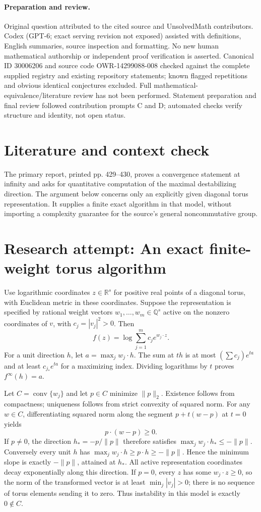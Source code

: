 \documentclass[11pt]{article}
\begin{document}
\paragraph{Preparation and review.}
Original question attributed to the cited source and UnsolvedMath contributors. Codex (GPT-6; exact serving revision not exposed) assisted with definitions, English summaries, source inspection and formatting. No new human mathematical authorship or independent proof verification is asserted. Canonical ID 30006206 and source code OWR-14299088-008 checked against the complete supplied registry and existing repository statements; known flagged repetitions and obvious identical conjectures excluded. Full mathematical-equivalence/literature review has not been performed. Statement preparation and final review followed contribution prompts C and D; automated checks verify structure and identity, not open status.
\label{end:30006206}

\section{Literature and context check}
The primary report, printed pp. 429--430, proves a convergence statement at infinity and asks for quantitative computation of the maximal destabilizing direction. The argument below concerns only an explicitly given diagonal torus representation. It supplies a finite exact algorithm in that model, without importing a complexity guarantee for the source's general noncommutative group.
\section{Research attempt: An exact finite-weight torus algorithm}

Use logarithmic coordinates $z\in\mathbb R^s$ for positive real points of a diagonal torus, with Euclidean metric in these coordinates. Suppose the representation is specified by rational weight vectors $w_1,\ldots,w_m\in\mathbb Q^s$ active on the nonzero coordinates of $v$, with $c_j=|v_j|^2>0$. Then
\[
f(z)=\log\sum_{j=1}^m c_j e^{w_j\cdot z}.
\]
For a unit direction $h$, let $a=\max_j w_j\cdot h$. The sum at $th$ is at most $(\sum c_j)e^{ta}$ and at least $c_{j_*}e^{ta}$ for a maximizing index. Dividing logarithms by $t$ proves $f^\infty(h)=a$.

Let $C=\operatorname{conv}\{w_j\}$ and let $p\in C$ minimize $\|p\|_2$. Existence follows from compactness; uniqueness follows from strict convexity of squared norm. For any $w\in C$, differentiating squared norm along the segment $p+t(w-p)$ at $t=0$ yields
\[
p\cdot(w-p)\geq0.
\]
If $p\ne0$, the direction $h_*=-p/\|p\|$ therefore satisfies $\max_j w_j\cdot h_*\leq-\|p\|$. Conversely every unit $h$ has $\max_j w_j\cdot h\geq p\cdot h\geq-\|p\|$. Hence the minimum slope is exactly $-\|p\|$, attained at $h_*$. All active representation coordinates decay exponentially along this direction. If $p=0$, every $z$ has some $w_j\cdot z\geq0$, so the norm of the transformed vector is at least $\min_j|v_j|>0$; there is no sequence of torus elements sending it to zero. Thus instability in this model is exactly $0\notin C$.
\end{document}
